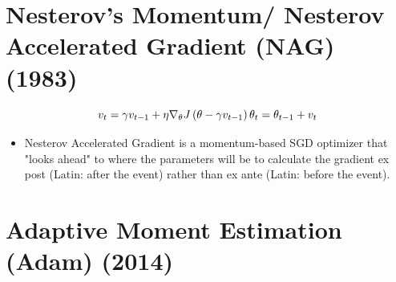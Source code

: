 \section{Nesterov’s Momentum/ Nesterov Accelerated Gradient (NAG) (1983) \cite{paperswithcode/method/nesterov-accelerated-gradient}}\label{Nesterov’s Momentum/ Nesterov Accelerated Gradient (NAG)}

\[
    v_{t} = \gamma{v}_{t-1} + \eta\nabla_{\theta}J\left(\theta-\gamma{v_{t-1}}\right)
    \hfill
    \theta_{t} = \theta_{t-1} + v_{t}
\]

\begin{itemize}
    \item Nesterov Accelerated Gradient is a momentum-based SGD optimizer that "looks ahead" to where the parameters will be to calculate the gradient ex post (Latin: after the event) rather than ex ante (Latin: before the event).

    
\end{itemize}




\section{Adaptive Moment Estimation (Adam) (2014) \cite{arxiv-1412.6980-adam}}\label{Adaptive Moment Estimation (Adam)}


